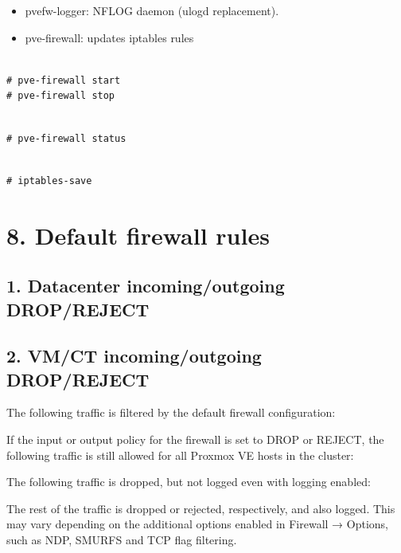 \begin{itemize}[leftmargin=2cm]

	\item pvefw-logger: NFLOG daemon (ulogd replacement).

	\item pve-firewall: updates iptables rules

\end{itemize}

\begin{lstlisting}

# pve-firewall start
# pve-firewall stop

\end{lstlisting}

\begin{lstlisting}

# pve-firewall status

\end{lstlisting}

\begin{lstlisting}

# iptables-save

\end{lstlisting}


\section{8. Default firewall rules}

\subsection{1. Datacenter incoming/outgoing DROP/REJECT}

\subsection{2. VM/CT incoming/outgoing DROP/REJECT}

The following traffic is filtered by the default firewall configuration:

If the input or output policy for the firewall is set to DROP or REJECT, the following traffic is still allowed for all Proxmox VE hosts in the cluster:

The following traffic is dropped, but not logged even with logging enabled:

The rest of the traffic is dropped or rejected, respectively, and also logged. This may vary depending on the additional options enabled in Firewall → Options, such as NDP, SMURFS and TCP flag filtering.

